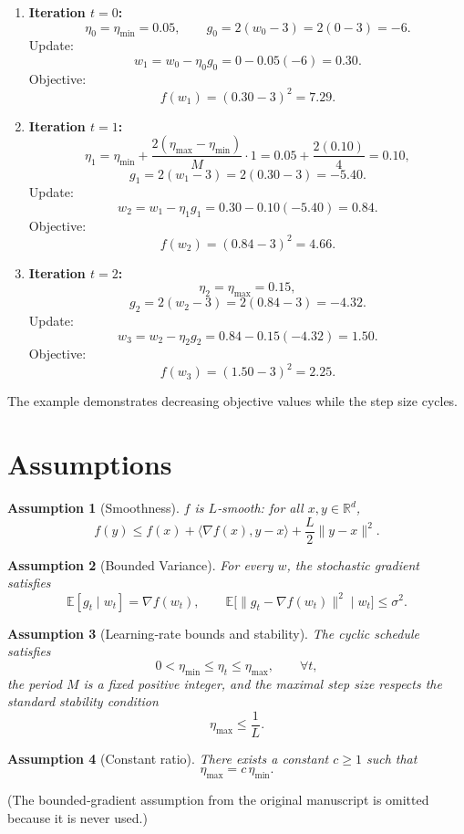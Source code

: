 \documentclass[11pt]{article}
\newtheorem{assumption}{Assumption}
\begin{document}
\begin{enumerate}
\item \textbf{Iteration $t=0$:} 
\[
\eta_0=\eta_{\min}=0.05,\qquad
g_0=2(w_0-3)=2(0-3)=-6.
\]
Update:
\[
w_1=w_0-\eta_0 g_0=0-0.05(-6)=0.30.
\]
Objective:
\[
f(w_1)=(0.30-3)^2=7.29.
\]

\item \textbf{Iteration $t=1$:} 
\[
\eta_1=\eta_{\min}+ \frac{2(\eta_{\max}-\eta_{\min})}{M}\cdot1
       =0.05+ \frac{2(0.10)}{4}=0.10,
\]
\[
g_1=2(w_1-3)=2(0.30-3)=-5.40.
\]
Update:
\[
w_2=w_1-\eta_1 g_1=0.30-0.10(-5.40)=0.84.
\]
Objective:
\[
f(w_2)=(0.84-3)^2=4.66.
\]

\item \textbf{Iteration $t=2$:} 
\[
\eta_2=\eta_{\max}=0.15,
\]
\[
g_2=2(w_2-3)=2(0.84-3)=-4.32.
\]
Update:
\[
w_3=w_2-\eta_2 g_2=0.84-0.15(-4.32)=1.50.
\]
Objective:
\[
f(w_3)=(1.50-3)^2=2.25.
\]
\end{enumerate}
The example demonstrates decreasing objective values while the step size cycles.

\newpage
\section*{Assumptions}
\begin{assumption}[Smoothness]\label{as:smooth}
$f$ is $L$‑smooth: for all $x,y\in\mathbb{R}^d$,
\[
f(y)\le f(x)+\langle\nabla f(x),y-x\rangle+\frac{L}{2}\|y-x\|^2 .
\]
\end{assumption}
\begin{assumption}[Bounded Variance]\label{as:var}
For every $w$, the stochastic gradient satisfies
\[
\mathbb{E}[g_t\mid w_t]=\nabla f(w_t),\qquad
\mathbb{E}\big[\|g_t-\nabla f(w_t)\|^2\mid w_t\big]\le\sigma^2 .
\]
\end{assumption}
\begin{assumption}[Learning‑rate bounds and stability]\label{as:lr}
The cyclic schedule satisfies
\[
0<\eta_{\min}\le\eta_t\le\eta_{\max},\qquad\forall t,
\]
the period $M$ is a fixed positive integer, and the maximal step size respects the
standard stability condition
\[
\eta_{\max}\le\frac{1}{L}.
\tag{3}
\]
\end{assumption}
\begin{assumption}[Constant ratio]\label{as:ratio}
There exists a constant $c\ge1$ such that
\[
\eta_{\max}=c\,\eta_{\min}.
\tag{4}
\]
\end{assumption}
(The bounded‑gradient assumption from the original manuscript is omitted because it is never used.)
\end{document}
